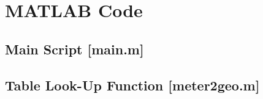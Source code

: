\chapter{MATLAB Code}
\label{App:MATLAB}


\section{Main Script [main.m]}



\section{Table Look-Up Function [meter2geo.m]}

